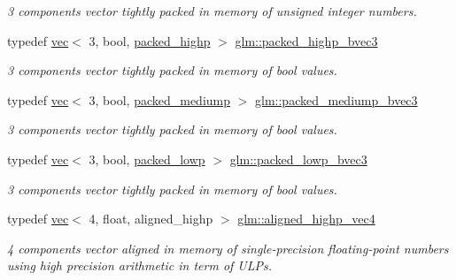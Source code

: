 \begin{DoxyCompactItemize}
\begin{DoxyCompactList}\small\item\em 3 components vector tightly packed in memory of unsigned integer numbers. \end{DoxyCompactList}\item 
typedef \mbox{\hyperlink{structglm_1_1vec}{vec}}$<$ 3, bool, \mbox{\hyperlink{namespaceglm_a36ed105b07c7746804d7fdc7cc90ff25a8e8791ee77fe079b1291f710d88031bf}{packed\+\_\+highp}} $>$ \mbox{\hyperlink{group__gtc__type__aligned_gafad47eaff82deab03a1e8d82d2dbd046}{glm\+::packed\+\_\+highp\+\_\+bvec3}}
\begin{DoxyCompactList}\small\item\em 3 components vector tightly packed in memory of bool values. \end{DoxyCompactList}\item 
typedef \mbox{\hyperlink{structglm_1_1vec}{vec}}$<$ 3, bool, \mbox{\hyperlink{namespaceglm_a36ed105b07c7746804d7fdc7cc90ff25a9604654c3b137cd7898689fd34b25bc0}{packed\+\_\+mediump}} $>$ \mbox{\hyperlink{group__gtc__type__aligned_ga5680ac66be8ba6f8bc6725553d4e8723}{glm\+::packed\+\_\+mediump\+\_\+bvec3}}
\begin{DoxyCompactList}\small\item\em 3 components vector tightly packed in memory of bool values. \end{DoxyCompactList}\item 
typedef \mbox{\hyperlink{structglm_1_1vec}{vec}}$<$ 3, bool, \mbox{\hyperlink{namespaceglm_a36ed105b07c7746804d7fdc7cc90ff25ac36a4bd74559be2c0b65bc48e5953b8b}{packed\+\_\+lowp}} $>$ \mbox{\hyperlink{group__gtc__type__aligned_gae995413af4c773ede88dfa5b13a82fab}{glm\+::packed\+\_\+lowp\+\_\+bvec3}}
\begin{DoxyCompactList}\small\item\em 3 components vector tightly packed in memory of bool values. \end{DoxyCompactList}\item 
typedef \mbox{\hyperlink{structglm_1_1vec}{vec}}$<$ 4, float, aligned\+\_\+highp $>$ \mbox{\hyperlink{group__gtc__type__aligned_ga60d6561b0daa150c617f3a7a277e44ee}{glm\+::aligned\+\_\+highp\+\_\+vec4}}
\begin{DoxyCompactList}\small\item\em 4 components vector aligned in memory of single-\/precision floating-\/point numbers using high precision arithmetic in term of U\+L\+Ps. \end{DoxyCompactList}\item 

\end{DoxyCompactItemize}
